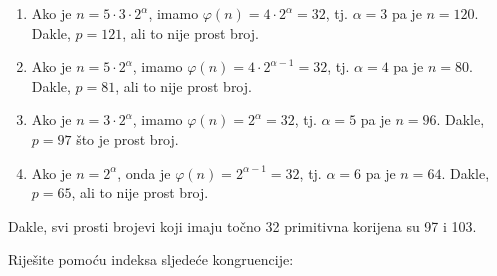 \documentclass{exam}
\newcommand{\Mod}[1]{\ (\mathrm{mod}\ #1)}
\begin{document}
\begin{questions}
\begin{solution}
\begin{enumerate}
    \item Ako je $n = 5 \cdot 3 \cdot 2^{\alpha}$, imamo $\varphi(n) = 4 \cdot 2^{\alpha} = 32$, tj. $\alpha = 3$ pa je $n = 120$. Dakle, $p = 121$, ali to nije prost broj.

    \item Ako je $n = 5 \cdot 2^{\alpha}$, imamo $\varphi(n) = 4 \cdot 2^{\alpha - 1} = 32$, tj. $\alpha = 4$ pa je $n = 80$. Dakle, $p = 81$, ali to nije prost broj.

    \item Ako je $n = 3 \cdot 2^{\alpha}$, imamo $\varphi(n) = 2^{\alpha} = 32$, tj. $\alpha = 5$ pa je $n = 96$. Dakle, $p = 97$ što je prost broj.

    \item Ako je $n = 2^{\alpha}$, onda je $\varphi(n) = 2^{\alpha - 1} = 32$, tj. $\alpha = 6$ pa je $n = 64$. Dakle, $p = 65$, ali to nije prost broj.
  \end{enumerate}
  Dakle, svi prosti brojevi koji imaju točno 32 primitivna korijena su 97 i 103.
\end{solution}

\question Riješite pomoću indeksa sljedeće kongruencije:

\begin{solution}
\end{solution}
\end{questions}
\end{document}
